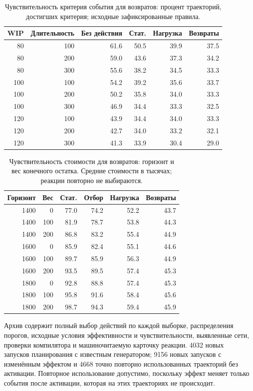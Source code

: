 \begin{table}[p]\caption{Чувствительность критерия события для возвратов: процент траекторий, достигших критерия; исходные зафиксированные правила.}\centering\small\setlength{\tabcolsep}{3pt}\begin{tabular}{rrrrrr}\toprule
WIP & Длительность & Без действия & Стат. & Нагрузка & Возвраты\\\midrule
80 & 100 & 61.6 & 50.5 & 39.9 & 37.5\\
80 & 200 & 59.0 & 43.6 & 37.3 & 34.2\\
80 & 300 & 55.6 & 38.2 & 34.5 & 33.3\\
100 & 100 & 54.2 & 39.2 & 35.6 & 33.7\\
100 & 200 & 50.2 & 35.8 & 34.0 & 33.3\\
100 & 300 & 46.9 & 34.4 & 33.3 & 32.5\\
120 & 100 & 43.9 & 34.4 & 34.0 & 33.3\\
120 & 200 & 42.7 & 34.0 & 33.2 & 32.1\\
120 & 300 & 41.3 & 33.9 & 30.4 & 29.0\\
\bottomrule\end{tabular}\end{table}
\begin{table}[p]\caption{Чувствительность стоимости для возвратов: горизонт и вес конечного остатка. Средние стоимости в тысячах; реакции повторно не выбираются.}\centering\small\setlength{\tabcolsep}{3pt}\begin{tabular}{rrrrrr}\toprule
Горизонт & Вес & Стат. & Отбор & Нагрузка & Возвраты\\\midrule
1400 & 0 & 77.0 & 74.2 & 52.2 & 43.7\\
1400 & 100 & 81.9 & 78.7 & 53.8 & 44.3\\
1400 & 200 & 86.8 & 83.2 & 55.4 & 44.9\\
1600 & 0 & 85.9 & 82.4 & 55.1 & 44.6\\
1600 & 100 & 89.7 & 85.9 & 56.3 & 44.9\\
1600 & 200 & 93.5 & 89.5 & 57.4 & 45.3\\
1800 & 0 & 92.8 & 88.8 & 57.4 & 45.3\\
1800 & 100 & 95.8 & 91.6 & 58.4 & 45.6\\
1800 & 200 & 98.7 & 94.3 & 59.4 & 45.9\\
\bottomrule\end{tabular}\end{table}
Архив содержит полный выбор действий по каждой выборке, распределения порогов, исходные условия эффективности и чувствительности, выявленные сети, проверки компилятора и машиночитаемую карточку реакции. 4032 новых запусков планирования с известным генератором; 9156 новых запусков с изменённым эффектом и 4668 точно повторно использованных траекторий без активации. Повторное использование допустимо, поскольку эффект меняет только события после активации, которая на этих траекториях не происходит.

